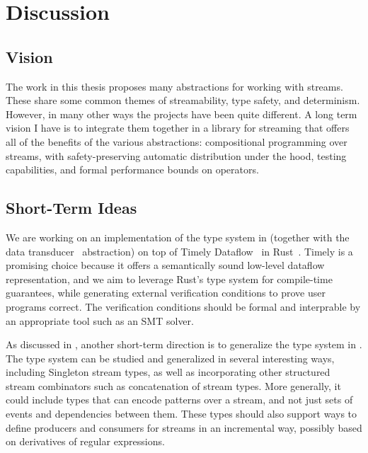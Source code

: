 \chapter{Discussion}
\label{cha:discussion}


\section{Vision}

The work in this thesis proposes many abstractions for working with streams. These share some common themes of streamability, type safety, and determinism.
However, in many other ways the projects have been quite different.
A long term vision I have is to integrate them together in a library for streaming that offers all of the benefits of the various abstractions:
compositional programming over streams, with safety-preserving automatic distribution under the hood, testing capabilities, and formal performance bounds on operators.

\section{Short-Term Ideas}

We are working on an implementation of the type system in  (together with the data transducer~ abstraction) on top of Timely Dataflow~\cite{Timely,Naiad2013} in Rust~\cite{RustLang}.
Timely is a promising choice because it offers a semantically sound low-level dataflow representation,
and we aim to leverage Rust's type system for compile-time guarantees,
while generating external verification conditions to prove user programs correct.
The verification conditions should be formal and interprable by an appropriate tool such as an SMT solver.

As discussed in , another short-term direction is to generalize the type system in .
The type system can be studied and generalized in several interesting ways, including Singleton stream types, as well as incorporating other structured stream combinators such as concatenation of stream types.
More generally, it could include types that can encode patterns over a stream, and not just sets of events and dependencies between them.
These types should also support ways to define producers and consumers for streams in an incremental way, possibly based on derivatives of regular expressions.

